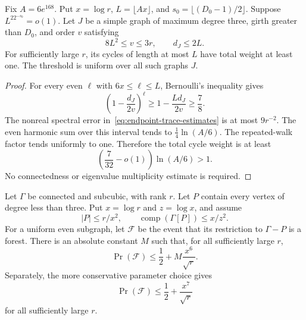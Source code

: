 \begin{lemma}
\label{lem:endpoint-block-supply}
Fix $A=6e^{168}$.
Put $x=\log r$, $L=\lfloor Ax\rfloor$, and $s_0=\lfloor(D_0-1)/2\rfloor$.
Suppose $L^22^{-s_0}=o(1)$.
Let $J$ be a simple graph of maximum degree three, girth greater than $D_0$, and order $v$ satisfying
\[
 8L^2\le v\le3r,
 \qquad d_J\le2L.
\]
For sufficiently large $r$, its cycles of length at most $L$ have total weight at least one.
The threshold is uniform over all such graphs $J$.
\end{lemma}

\begin{proof}
For every even $\ell$ with $6x\le\ell\le L$, Bernoulli's inequality gives
\[
 \left(1-\frac{d_J}{2v}\right)^\ell
 \ge1-\frac{Ld_J}{2v}\ge\frac78.
\]
The nonreal spectral error in~\eqref{eq:endpoint-trace-estimates} is at most $9r^{-2}$.
The even harmonic sum over this interval tends to $\tfrac14\ln(A/6)$.
The repeated-walk factor tends uniformly to one.
Therefore the total cycle weight is at least
\[
 \left(\frac7{32}-o(1)\right)\ln(A/6)>1.
\]
No connectedness or eigenvalue multiplicity estimate is required.
\end{proof}

\begin{theorem}
\label{thm:parallel-links-endpoint-forest}
Let $\Gamma$ be connected and subcubic, with rank $r$.
Let $P$ contain every vertex of degree less than three.
Put $x=\log r$ and $z=\log x$, and assume
\[
 |P|\le r/x^2,
 \qquad \operatorname{comp}(\Gamma[P])\le x/z^2.
\]
For a uniform even subgraph, let $\mathcal F$ be the event that its restriction to $\Gamma-P$ is a forest.
There is an absolute constant $M$ such that, for all sufficiently large $r$,
\begin{equation}\label{eq:endpoint-forest-log-six}
 \Pr(\mathcal F)\le\frac12+M\frac{x^6}{\sqrt r}.
\end{equation}
Separately, the more conservative parameter choice gives
\begin{equation}\label{eq:endpoint-forest-log-seven}
 \Pr(\mathcal F)\le\frac12+\frac{x^7}{\sqrt r}
\end{equation}
for all sufficiently large $r$.
\end{theorem}

